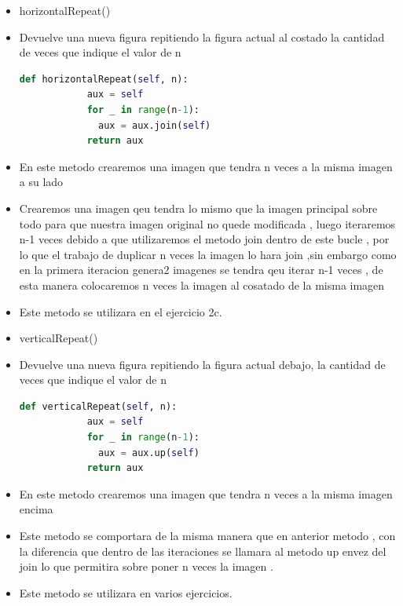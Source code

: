 \documentclass{article}
\begin{document}
\begin{itemize}
		 \item horizontalRepeat()
		 \item Devuelve una nueva figura repitiendo la figura actual al costado
		 la cantidad de veces que indique el valor de n
		 \begin{lstlisting}[language=Python, caption={horizontalRepeat}, float=H]
			def horizontalRepeat(self, n):
			aux = self
			for _ in range(n-1):
			  aux = aux.join(self) 
			return aux
		 \end{lstlisting}
		 \item En este metodo crearemos una imagen que tendra n veces a la misma imagen a su lado
		 \item Crearemos una imagen qeu tendra lo mismo que la imagen principal sobre todo para que nuestra imagen original no quede modificada , luego iteraremos n-1 veces debido
		       a que utilizaremos el metodo join dentro de este bucle , por lo que el trabajo de duplicar n veces la imagen lo hara join ,sin embargo como en la primera iteracion genera2 imagenes se tendra qeu iterar n-1 veces
			   , de esta manera colocaremos n veces la imagen al cosatado de la misma imagen   
		 \item Este metodo se utilizara en el ejercicio 2c.
		 
		 \item verticalRepeat()
		 \item Devuelve una nueva figura repitiendo la figura actual debajo, la cantidad
		 de veces que indique el valor de n
		 \begin{lstlisting}[language=Python, caption={verticalRepeat}, float=H]
			def verticalRepeat(self, n):
			aux = self
			for _ in range(n-1):
			  aux = aux.up(self) 
			return aux
		 \end{lstlisting}
		 \item En este metodo crearemos una imagen que tendra n veces a la misma imagen encima
		 \item Este metodo se comportara de la misma manera que en anterior metodo , con la diferencia que dentro de las iteraciones se llamara al metodo up envez del join
		       lo que permitira sobre poner n veces la imagen .
		 \item Este metodo se utilizara en varios ejercicios.
	\end{itemize} 
	
\end{document}
